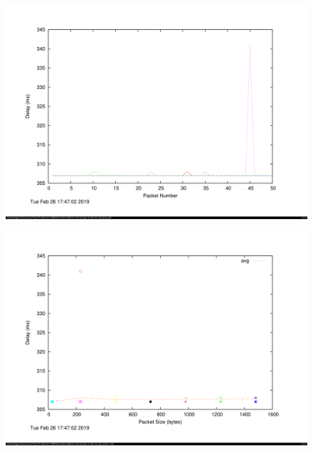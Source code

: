 \documentclass[a4paper,11pt]{article}
\begin{document}
		\begin{figure}[!htb]
		    \centering
		    \begin{minipage}{\textwidth}
		        \centering
		        \includegraphics[width=\linewidth, height=0.43\textheight]{tuberlindelay.png}
		    \end{minipage}%
		\end{figure}

		\begin{figure}[!htb]
			\centering
		    \begin{minipage}{\textwidth}
		        \centering
		        \includegraphics[width=\linewidth, height=0.43\textheight]{tuberlinscatter.png}
		    \end{minipage}
		\end{figure}
\end{document}
